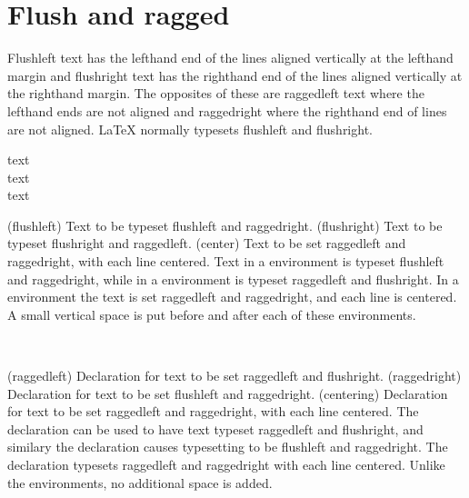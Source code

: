 

\section{Flush and ragged}

    Flushleft text has the lefthand end of the lines 
aligned vertically at the lefthand margin and
flushright text has the righthand end of the lines 
aligned vertically at the righthand margin. The
opposites of these are raggedleft text where the 
lefthand ends are not aligned
and raggedright where the righthand end of lines are 
not aligned. LaTeX normally typesets flushleft and flushright.

\begin{syntax}
 text  \\
 text  \\
 text  \\
\end{syntax}
\glossary(flushleft)%
  {}%
  {Text to be typeset flushleft and raggedright.}
\glossary(flushright)%
  {}%
  {Text to be typeset flushright and raggedleft.}
\glossary(center)%
  {}%
  {Text to be set raggedleft and raggedright, with each line centered.}
    Text in a  environment is typeset flushleft and raggedright,
while in a  environment is typeset raggedleft and flushright.
In a  environment the text is set raggedleft and raggedright, 
and each line is centered. A small vertical space is put before and after 
each of these environments.

\begin{syntax}
\cmd{\raggedleft} \cmd{\raggedright} \cmd{\centering} \\
\end{syntax} 
\glossary(raggedleft)
  {}%
  {Declaration for text to be set raggedleft and flushright.}
\glossary(raggedright)
  {}%
  {Declaration for text to be set flushleft and raggedright.}
\glossary(centering)%
  {}%
  {Declaration for text to be set raggedleft and raggedright, 
   with each line centered.}
     The \cmd{\raggedleft} declaration can be used to have text typeset
raggedleft and flushright, and similary the declaration \cmd{\raggedright}
causes typesetting to be flushleft and raggedright. The declaration 
\cmd{\centering} typesets raggedleft and raggedright with each line centered.
Unlike the environments, no additional space is added. 


